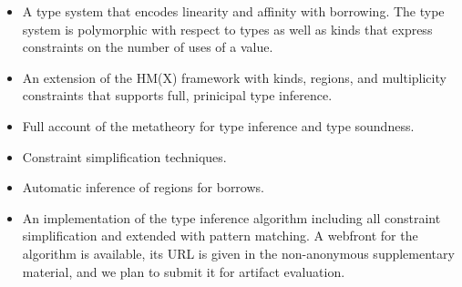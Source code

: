 \begin{itemize}
\item A type system that encodes linearity and affinity with
  borrowing. The type system is polymorphic with respect to types as
  well as kinds that express constraints on the number of uses of a value.
\item An extension of the HM(X) framework
  \cite{DBLP:journals/tapos/OderskySW99} with kinds, regions, and
  multiplicity constraints that supports full, prinicipal type
  inference.
\item Full account of the metatheory for type inference and type soundness.
\item Constraint simplification techniques.
\item Automatic inference of regions for borrows.
\item An implementation of the type inference algorithm including all
  constraint simplification and extended with pattern matching. A
  webfront for the algorithm is available, its URL is given in the
  non-anonymous supplementary material, and we plan to submit it for
  artifact evaluation.
\end{itemize}

